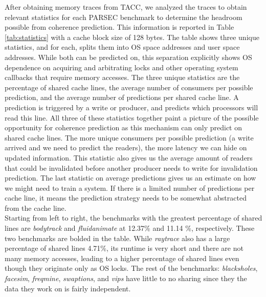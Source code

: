         After obtaining memory traces from TACC, we analyzed the traces to obtain relevant statistics for each PARSEC benchmark to determine the headroom possible from coherence prediction. This information is reported in Table \ref{tab:statistics} with a cache block size of 128 bytes. The table shows three unique statistics, and for each, splits them into OS space addresses and user space addresses. While both can be predicted on, this separation explicitly shows OS dependence on acquiring and arbitrating locks and other operating system callbacks that require memory accesses. The three unique statistics are the percentage of shared cache lines, the average number of consumers per possible prediction, and the average number of predictions per shared cache line. A prediction is triggered by a write or producer, and predicts which processors will read this line. All three of these statistics together paint a picture of the possible opportunity for coherence prediction as this mechanism can only predict on shared cache lines. The more unique consumers per possible prediction (a write arrived and we need to predict the readers), the more latency we can hide on updated information. This statistic also gives us the average amount of readers that could be invalidated before another producer needs to write for invalidation prediction. The last statistic on average predictions gives us an estimate on how we might need to train a system. If there is a limited number of predictions per cache line, it means the prediction strategy needs to be somewhat abstracted from the cache line. \\
    
        Starting from left to right, the benchmarks with the greatest percentage of shared lines are \textit{bodytrack} and \textit{fluidanimate} at 12.37\% and 11.14 \%, respectively. These two benchmarks are bolded in the table. While \textit{raytrace} also has a large percentage of shared lines 4.71\%, its runtime is very short and there are not many memory accesses, leading to a higher percentage of shared lines even though they originate only as OS locks. The rest of the benchmarks: \textit{blacksholes}, \textit{facesim}, \textit{freqmine}, \textit{swaptions}, and \textit{vips} have little to no sharing since they the data they work on is fairly independent. \\
    
